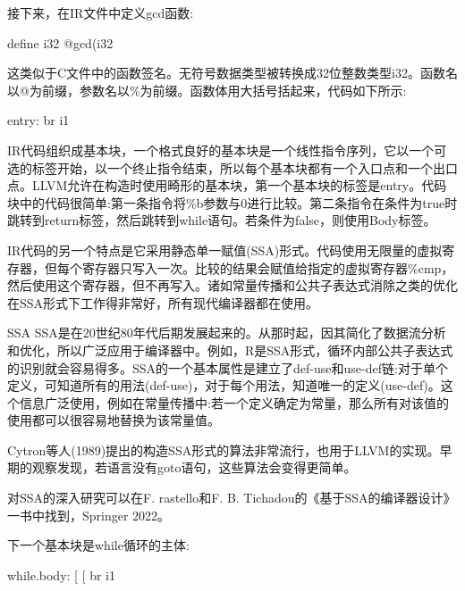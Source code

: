 接下来，在IR文件中定义gcd函数:

\begin{shell}
define i32 @gcd(i32 %
\end{shell}

这类似于C文件中的函数签名。无符号数据类型被转换成32位整数类型i32。函数名以@为前缀，参数名以\%为前缀。函数体用大括号括起来，代码如下所示:

\begin{shell}
entry:
    br i1 %
\end{shell}

IR代码组织成基本块，一个格式良好的基本块是一个线性指令序列，它以一个可选的标签开始，以一个终止指令结束，所以每个基本块都有一个入口点和一个出口点。LLVM允许在构造时使用畸形的基本块，第一个基本块的标签是entry。代码块中的代码很简单:第一条指令将\%b参数与0进行比较。第二条指令在条件为true时跳转到return标签，然后跳转到while语句。若条件为false，则使用Body标签。

IR代码的另一个特点是它采用静态单一赋值(SSA)形式。代码使用无限量的虚拟寄存器，但每个寄存器只写入一次。比较的结果会赋值给指定的虚拟寄存器\%cmp，然后使用这个寄存器，但不再写入。诸如常量传播和公共子表达式消除之类的优化在SSA形式下工作得非常好，所有现代编译器都在使用。

\begin{myTip}{SSA}
SSA是在20世纪80年代后期发展起来的。从那时起，因其简化了数据流分析和优化，所以广泛应用于编译器中。例如，R是SSA形式，循环内部公共子表达式的识别就会容易得多。SSA的一个基本属性是建立了def-use和use-def链:对于单个定义，可知道所有的用法(def-use)，对于每个用法，知道唯一的定义(use-def)。这个信息广泛使用，例如在常量传播中:若一个定义确定为常量，那么所有对该值的使用都可以很容易地替换为该常量值。

Cytron等人(1989)提出的构造SSA形式的算法非常流行，也用于LLVM的实现。早期的观察发现，若语言没有goto语句，这些算法会变得更简单。

对SSA的深入研究可以在F. rastello和F. B. Tichadou的《基于SSA的编译器设计》一书中找到，Springer 2022。
\end{myTip}

下一个基本块是while循环的主体:

\begin{shell}
while.body:
                        [ %
                        [ %
    br i1 %
\end{shell}

